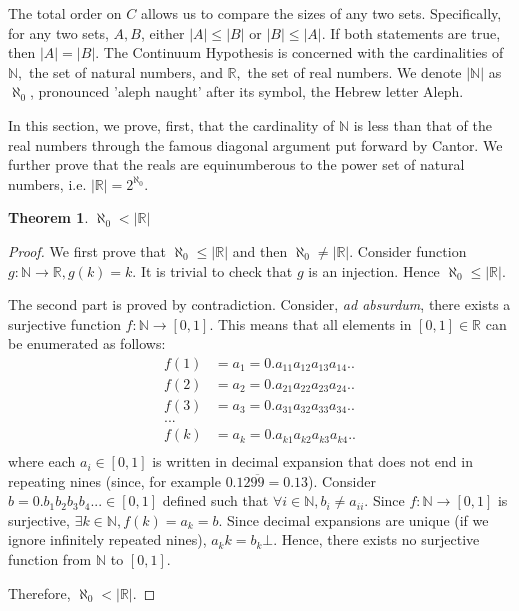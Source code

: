 \documentclass[12pt]{article}
\theoremstyle{definition}
\newtheorem{theorem}{Theorem}[section]
\begin{document}
The total order on $C$ allows us to compare the sizes of any two sets. Specifically, for any two sets, $A, B$, either $|A|\leq |B|$ or $|B|\leq |A|$. If both statements are true, then $|A|=|B|$. The Continuum Hypothesis is concerned with the cardinalities of $\mathbb{N},$ the set of natural numbers, and $\mathbb{R},$ the set of real numbers. We denote $|
\mathbb{N}|$ as $\aleph_0$, pronounced 'aleph naught' after its symbol, the Hebrew letter Aleph.

In this section, we prove, first, that the cardinality of $\mathbb{N}$ is less than that of the real numbers through the famous diagonal argument put forward by Cantor. We further prove that the reals are equinumberous to the power set of natural numbers, i.e. $|\mathbb{R}|=2^{\aleph_0}$.

\begin{theorem}
    $\aleph_0 < |\mathbb{R}|$
\end{theorem}
\begin{proof}
    We first prove that $\aleph_0 \leq |\mathbb{R}|$ and then $\aleph_0 \neq |\mathbb{R}|$. Consider function $g:\mathbb{N}\to\mathbb{R}, g(k)=k$. It is trivial to check that $g$ is an injection. Hence $\aleph_0 \leq |\mathbb{R}|$.
    
    The second part is proved by contradiction. Consider, \textit{ad absurdum}, there exists a surjective function $f:\mathbb{N}\to[0,1]$. This means that all elements in $[0,1]\in\mathbb{R}$ can be enumerated as follows:
    \begin{align*}
        f(1)&=a_1=0.a_{11}a_{12}a_{13}a_{14}.. \\
        f(2)&=a_2=0.a_{21}a_{22}a_{23}a_{24}.. \\
        f(3)&=a_3=0.a_{31}a_{32}a_{33}a_{34}.. \\
        ... \\
        f(k)&=a_k=0.a_{k1}a_{k2}a_{k3}a_{k4}.. \\
    \end{align*}
    where each $a_i\in[0,1]$ is written in decimal expansion that does not end in repeating nines (since, for example $0.12\overline{99}=0.13$). Consider $b=0.b_1b_2b_3b_4...\in[0,1]$ defined such that $\forall i\in\mathbb{N},b_i\neq a_{ii}.$ Since $f:\mathbb{N}\to[0,1]$ is surjective, $\exists k\in\mathbb{N}, f(k)=a_k=b$. Since decimal expansions are unique (if we ignore infinitely repeated nines), $a_kk=b_k\bot$. Hence, there exists no surjective function from $\mathbb{N}$ to $[0,1]$.
    
    Therefore, $\aleph_0 < |\mathbb{R}|$.
\end{proof}
\end{document}
